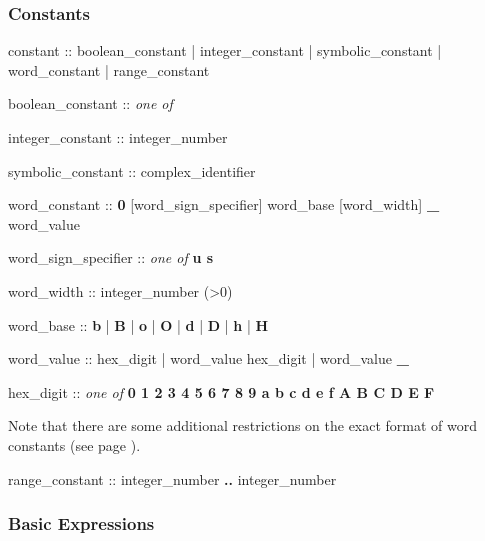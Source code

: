 \subsubsection{Constants}
\begin{Grammar}
constant ::
        boolean_constant
      | integer_constant
      | symbolic_constant
      | word_constant
      | range_constant
\end{Grammar}

\begin{Grammar}
boolean_constant :: \emph{one of} 
                     
\end{Grammar}

\begin{Grammar}
integer_constant :: integer_number
\end{Grammar}

\begin{Grammar}
symbolic_constant :: complex_identifier
\end{Grammar}

\begin{Grammar}
word_constant :: \textbf{0} [word_sign_specifier] word_base [word_width] \textbf{_} word_value

word_sign_specifier :: \emph{one of} 
        \textbf{u s}

word_width :: integer_number (>0)

word_base :: \textbf{b} | \textbf{B} | \textbf{o} | \textbf{O} | \textbf{d} | \textbf{D} | \textbf{h} |  \textbf{H}

word_value :: 
        hex_digit
      | word_value hex_digit
      | word_value \textbf{\_}

hex_digit :: \emph{one of}  
        \textbf{0 1 2 3 4 5 6 7 8 9 a b c d e f A B C D E F}
\end{Grammar}

Note that there are some additional restrictions on the exact format of word constants (see page \pageref{the notes on word constants}).

\begin{Grammar}
range_constant :: 
        integer_number \textbf{..} integer_number
\end{Grammar}

\subsubsection{Basic Expressions}

